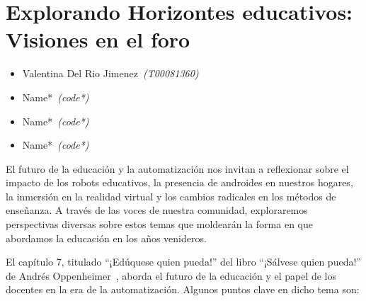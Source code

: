\documentclass[letterpaper, 12pt]{article}
\newcommand{\liderValentina}{Valentina Del Rio Jimenez~}
\begin{document}
\section*{Explorando Horizontes educativos: Visiones en el foro}

\noindent\makebox[\linewidth]{\rule{\textwidth}{0.4pt}}

\begin{itemize}[label=$\diamond$]
    \item \liderValentina\textit{(T00081360)}
    \item Name*~\textit{(code*)}
    \item Name*~\textit{(code*)}
    \item Name*~\textit{(code*)}
\end{itemize}

\noindent\makebox[\linewidth]{\rule{\textwidth}{0.4pt}}

\nocite{reference_book}
\nocite{capacitar_trabajadores}
\nocite{Soledad}
\nocite{Parra_2022}
\nocite{Unir_2023}


El futuro de la educación y la automatización nos invitan a
reflexionar sobre el impacto de los robots educativos, la
presencia de androides en nuestros hogares, la inmersión en
la realidad virtual y los cambios radicales en los métodos
de enseñanza. A través de las voces de nuestra comunidad,
exploraremos perspectivas diversas sobre estos temas que
moldearán la forma en que abordamos la educación en los
años venideros.


El capítulo 7, titulado ``¡Edúquese quien pueda!'' del
libro ``¡Sálvese quien pueda!'' de Andrés
Oppenheimer~\cite{reference_book}, aborda el futuro de la
educación y el papel de los docentes en la era de la
automatización. Algunos puntos clave en dicho tema son:
\end{document}
